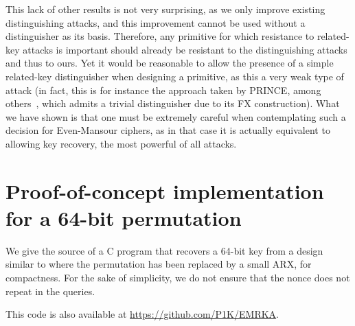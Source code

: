 This lack of other results is not very surprising, as we only improve existing distinguishing
attacks, and this improvement cannot be used without a distinguisher as its basis.
Therefore, any primitive for which resistance to related-key attacks is important should already be resistant
to the distinguishing attacks and thus to ours. Yet it would be reasonable to allow the presence
of a simple related-key distinguisher when designing a primitive, as this a very weak type of
attack (in fact, this is for instance the approach taken by PRINCE, among others~\cite{PRINCE}, which admits
a trivial distinguisher due to its FX construction).
What we have shown is that one must be
extremely careful when contemplating such a decision for Even-Mansour ciphers, as in that case it is actually
equivalent to allowing key recovery, the most powerful of all attacks.


\section{Proof-of-concept implementation for a 64-bit permutation}
\label{sec:toy}

We give the source of a C program that recovers a 64-bit key from a design similar to \proestotr where
the permutation has been replaced by a small ARX, for compactness. For the sake of simplicity,
we do not ensure that the nonce does not repeat in the queries.

\noindent
This code is also available at \url{https://github.com/P1K/EMRKA}.

